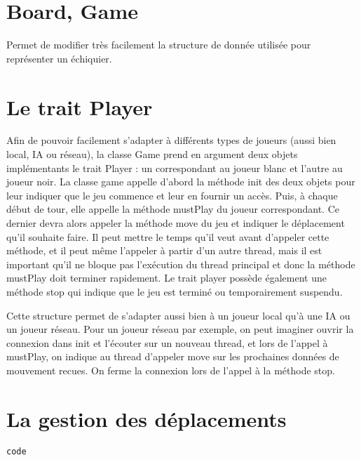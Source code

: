 \documentclass[11pt]{article}
\begin{document}
\section{Board, Game}
Permet de modifier très facilement la structure de donnée utilisée pour représenter un échiquier.

\section{Le trait Player}

Afin de pouvoir facilement s'adapter à différents types de joueurs (aussi bien local, IA ou réseau), la classe Game prend en argument deux objets implémentants le trait Player : un correspondant au joueur blanc et l'autre au joueur noir.
La classe game appelle d'abord la méthode init des deux objets pour leur indiquer que le jeu commence et leur en fournir un accès.
Puis, à chaque début de tour, elle appelle la méthode mustPlay du joueur correspondant. Ce dernier devra alors appeler la méthode move du jeu et indiquer le déplacement qu'il souhaite faire. Il peut mettre le temps qu'il veut avant d'appeler cette méthode, et il peut même l'appeler à partir d'un autre thread, mais il est important qu'il ne bloque pas l'exécution du thread principal et donc la méthode mustPlay doit terminer rapidement.
Le trait player possède également une méthode stop qui indique que le jeu est terminé ou temporairement suspendu.\newline


Cette structure permet de s'adapter aussi bien à un joueur local qu'à une IA ou un joueur réseau. Pour un joueur réseau par exemple, on peut imaginer ouvrir la connexion dans init et l'écouter sur un nouveau thread, et lors de l'appel à mustPlay, on indique au thread d'appeler move sur les prochaines données de mouvement recues. On ferme la connexion lors de l'appel à la méthode stop.

\section{La gestion des déplacements}

\begin{lstlisting}
code
\end{lstlisting}
\end{document}
